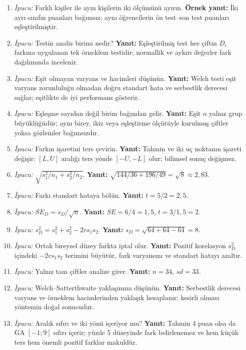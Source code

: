 \begin{enumerate}[leftmargin=*,itemsep=5pt]
\item \emph{İpucu:} Farklı kişiler ile aynı kişilerin iki ölçümünü ayırın.
\textbf{Örnek yanıt:} İki ayrı sınıfın puanları bağımsız; aynı öğrencilerin
ön test--son test puanları eşleştirilmiştir.
\item \emph{İpucu:} Testin analiz birimi nedir?
\textbf{Yanıt:} Eşleştirilmiş test her çiftin $D_i$ farkına uygulanan tek
örneklem testidir; normallik ve aykırı değerler fark dağılımında incelenir.
\item \emph{İpucu:} Eşit olmayan varyans ve hacimleri düşünün.
\textbf{Yanıt:} Welch testi eşit varyans zorunluluğu olmadan doğru standart
hata ve serbestlik derecesi sağlar; eşitlikte de iyi performans gösterir.
\item \emph{İpucu:} Eşleşme sayıdan değil birim bağından gelir.
\textbf{Yanıt:} Eşit $n$ yalnız grup büyüklüğüdür; aynı birey, ikiz veya
eşleştirme ölçütüyle kurulmuş çiftler yoksa gözlemler bağımsızdır.
\item \emph{İpucu:} Farkın işaretini ters çevirin.
\textbf{Yanıt:} Tahmin ve iki uç noktanın işareti değişir:
$[L,U]$ aralığı ters yönde $[-U,-L]$ olur; bilimsel sonuç değişmez.
\item \emph{İpucu:} $\sqrt{s_1^2/n_1+s_2^2/n_2}$.
\textbf{Yanıt:} $\sqrt{144/36+196/49}=\sqrt8\approx2{,}83$.
\item \emph{İpucu:} Farkı standart hataya bölün.
\textbf{Yanıt:} $t=5/2=2{,}5$.
\item \emph{İpucu:} $SE_D=s_D/\sqrt n$.
\textbf{Yanıt:} $SE=6/4=1{,}5$, $t=3/1{,}5=2$.
\item \emph{İpucu:} $s_D^2=s_1^2+s_2^2-2rs_1s_2$.
\textbf{Yanıt:} $s_D=\sqrt{64+64-64}=8$.
\item \emph{İpucu:} Ortak bireysel düzey farkta iptal olur.
\textbf{Yanıt:} Pozitif korelasyon $s_D^2$ içindeki $-2rs_1s_2$ terimini
büyütür, fark varyansını ve standart hatayı azaltır.
\item \emph{İpucu:} Yalnız tam çiftler analize girer.
\textbf{Yanıt:} $n=34$, $sd=33$.
\item \emph{İpucu:} Welch--Satterthwaite yaklaşımını düşünün.
\textbf{Yanıt:} Serbestlik derecesi varyans ve örneklem hacimlerinden yaklaşık
hesaplanır; kesirli olması yöntemin doğal sonucudur.
\item \emph{İpucu:} Aralık sıfırı ve iki yönü içeriyor mu?
\textbf{Yanıt:} Tahmin 4 puan olsa da GA $[-1;9]$ sıfırı içerir; yüzde 5
düzeyinde fark belirlenemez ve hem küçük ters hem önemli pozitif farklar makuldür.

\end{enumerate}
